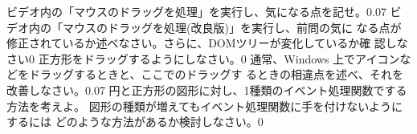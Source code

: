 \documentclass[a4j]{jreport}
\begin{document}
{
{\Must ビデオ内の「マウスのドラッグを処理」を実行し、気になる点を記せ。}{0.07}
{\Must ビデオ内の「マウスのドラッグを処理(改良版)」を実行し、前問の気に
なる点が修正されているか述べなさい。さらに、DOMツリーが変化しているか確
認しなさい}{0}
{\Must 正方形をドラッグするようにしなさい。}{0}
{通常、Windows 上でアイコンなどをドラッグするときと、ここでのドラッグす
るときの相違点を述べ、それを改善しなさい。}{0.07}
{円と正方形の図形に対し、1種類のイベント処理関数でする方法を考えよ。
			 図形の種類が増えてもイベント処理関数に手を付けないようにするには
			 どのような方法があるか検討しなさい。}{0}
       }
\newcommand{\ResultA}{{ \bfseries\normalsize リ 説 図 考}}
\newcommand{\ResultEI}{{ \bfseries\normalsize 説 考}}
\newcommand{\ResultFI}{{ \bfseries\normalsize 図 考}}
\end{document}
